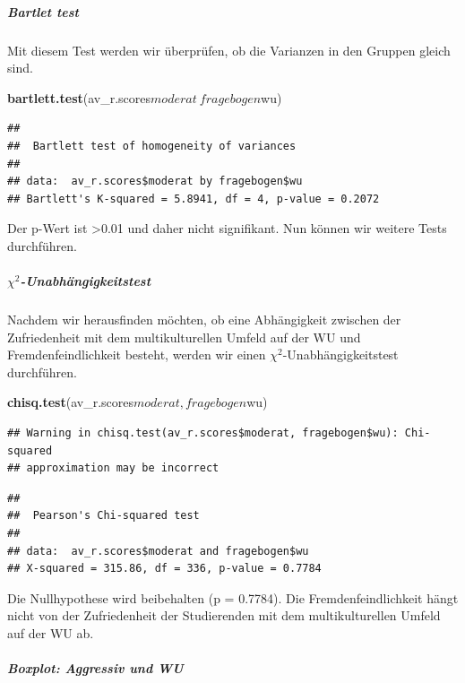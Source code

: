 \documentclass[]{article}
\newenvironment{Shaded}{\begin{snugshade}}{\end{snugshade}}
\newcommand{\KeywordTok}[1]{\textcolor[rgb]{0.13,0.29,0.53}{\textbf{{#1}}}}
\newcommand{\NormalTok}[1]{{#1}}
\let\oldsubparagraph\subparagraph
\renewcommand{\subparagraph}[1]{\oldsubparagraph{#1}\mbox{}}
\begin{document}
\subparagraph{Bartlet test}\label{bartlet-test}

Mit diesem Test werden wir überprüfen, ob die Varianzen in den Gruppen
gleich sind.

\begin{Shaded}
\begin{Highlighting}[]
\KeywordTok{bartlett.test}\NormalTok{(av_r.scores$moderat~fragebogen$wu)}
\end{Highlighting}
\end{Shaded}

\begin{verbatim}
## 
##  Bartlett test of homogeneity of variances
## 
## data:  av_r.scores$moderat by fragebogen$wu
## Bartlett's K-squared = 5.8941, df = 4, p-value = 0.2072
\end{verbatim}

Der p-Wert ist \textgreater{}0.01 und daher nicht signifikant. Nun
können wir weitere Tests durchführen.

\subparagraph{\texorpdfstring{\(\chi^2\)-Unabhängigkeitstest}{\textbackslash{}chi\^{}2-Unabhängigkeitstest}}\label{chi2-unabhangigkeitstest}

Nachdem wir herausfinden möchten, ob eine Abhängigkeit zwischen der
Zufriedenheit mit dem multikulturellen Umfeld auf der WU und
Fremdenfeindlichkeit besteht, werden wir einen
\(\chi^2\)-Unabhängigkeitstest durchführen.

\begin{Shaded}
\begin{Highlighting}[]
\KeywordTok{chisq.test}\NormalTok{(av_r.scores$moderat, fragebogen$wu)}
\end{Highlighting}
\end{Shaded}

\begin{verbatim}
## Warning in chisq.test(av_r.scores$moderat, fragebogen$wu): Chi-squared
## approximation may be incorrect
\end{verbatim}

\begin{verbatim}
## 
##  Pearson's Chi-squared test
## 
## data:  av_r.scores$moderat and fragebogen$wu
## X-squared = 315.86, df = 336, p-value = 0.7784
\end{verbatim}

Die Nullhypothese wird beibehalten (p = 0.7784). Die
Fremdenfeindlichkeit hängt nicht von der Zufriedenheit der Studierenden
mit dem multikulturellen Umfeld auf der WU ab.

\subparagraph{Boxplot: Aggressiv und WU}\label{boxplot-aggressiv-und-wu}
\end{document}

